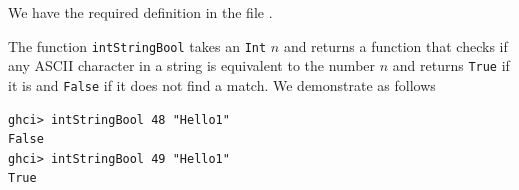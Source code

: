We have the required definition in the file .

The function \verb|intStringBool| takes an \verb|Int| $n$ and returns a function
that checks if any ASCII character in a string is equivalent to the number $n$ and
returns \verb|True| if it is and \verb|False| if it does not find a match. We
demonstrate as follows
\begin{lstlisting}
ghci> intStringBool 48 "Hello1"
False
ghci> intStringBool 49 "Hello1"
True
\end{lstlisting}
